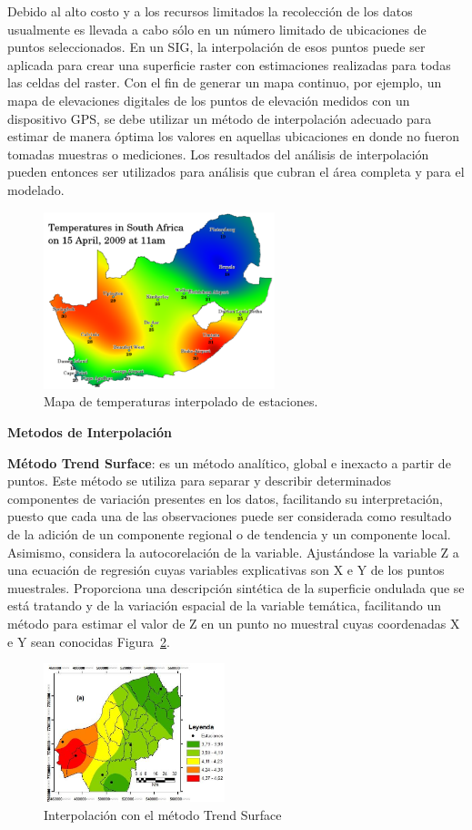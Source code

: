 Debido al alto costo y a los recursos limitados la recolección de los datos usualmente es llevada a cabo sólo en un número limitado 
de ubicaciones de puntos seleccionados. En un SIG, la interpolación de esos puntos puede ser aplicada para crear una superficie raster con 
estimaciones realizadas para todas las celdas del raster. Con el fin de generar un mapa continuo, por ejemplo, un mapa de elevaciones digitales de 
los puntos de elevación medidos con un dispositivo GPS, se debe utilizar un método de interpolación adecuado para estimar de manera óptima los valores 
en aquellas ubicaciones en donde no fueron tomadas muestras o mediciones. Los resultados del análisis de interpolación pueden entonces ser utilizados 
para análisis que cubran el área completa y para el modelado.

\begin{figure}[htbp]
 \centering 
 \includegraphics[width=0.6\textwidth]{pictures/is.png}
 \caption{Mapa de temperaturas interpolado de estaciones.}
 \label{fig:is}
\end{figure}
\textbf{Metodos de Interpolación}\bigskip

\textbf{Método Trend Surface}: es un método analítico, global e inexacto a partir de puntos. Este
método se utiliza para separar y describir determinados componentes de variación presentes
en los datos, facilitando su interpretación, puesto que cada una de las observaciones puede ser
considerada como resultado de la adición de un componente regional o de tendencia y un
componente local. Asimismo, considera la autocorelación de la variable.
Ajustándose la variable Z a una ecuación de regresión cuyas variables explicativas son X e Y
de los puntos muestrales. Proporciona una descripción sintética de la superficie ondulada que
se está tratando y de la variación espacial de la variable temática, facilitando un método para
estimar el valor de Z en un punto no muestral cuyas coordenadas X e Y sean conocidas Figura~\ref{fig:m1}.
\begin{figure}[htb]
 \centering 
 \includegraphics[width=0.47\textwidth]{pictures/a.png}
 \caption{Interpolación con el método Trend Surface\cite{models2013}}
 \label{fig:m1}
\end{figure}

